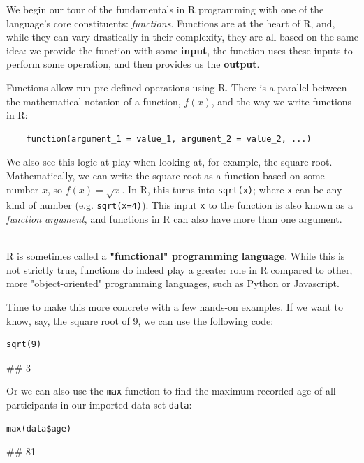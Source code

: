We begin our tour of the fundamentals in \textsf{R} programming with one of the language's core constituents: \emph{functions}. Functions are at the heart of \textsf{R}, and, while they can vary drastically in their complexity, they are all based on the same idea: we provide the function with some \textbf{input}, the function uses these inputs to perform some operation, and then provides us the \textbf{output}.

Functions allow run pre-defined operations using \textsf{R}. There is a parallel between the mathematical notation of a function, $f(x)$, and the way we write functions in \textsf{R}:

\begin{lstlisting}
    function(argument_1 = value_1, argument_2 = value_2, ...)
\end{lstlisting}

We also see this logic at play when looking at, for example, the square root. Mathematically, we can write the square root as a function based on some number $x$, so $f(x)=\sqrt{x}$. In \textsf{R}, this turns into \texttt{sqrt(x)}; where \texttt{x} can be any kind of number (e.g. \texttt{sqrt(x=4)}). This input \texttt{x} to the function is also known as a \emph{function argument}, and functions in \textsf{R} can also have more than one argument.

\begin{box-info} \\

\textsf{R} is sometimes called a \textbf{"functional" programming language}. While this is not strictly true, functions do indeed play a greater role in \textsf{R} compared to other, more "object-oriented" programming languages, such as Python or Javascript.

\end{box-info}

Time to make this more concrete with a few hands-on examples. If we want to know, say, the square root of 9, we can use the following code:

\begin{lstlisting}
sqrt(9)
\end{lstlisting}
\begin{example}
## 3
\end{example}

Or we can also use the \texttt{max} function to find the maximum recorded age of all participants in our imported data set \texttt{data}:

\begin{lstlisting}
max(data$age)
\end{lstlisting}
\begin{example}
## 81
\end{example}

